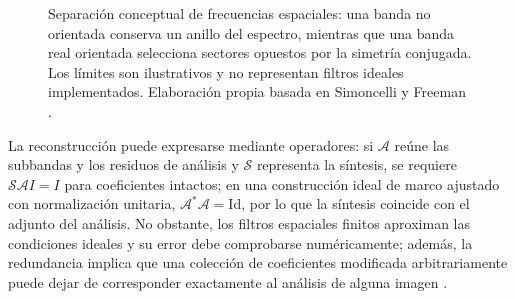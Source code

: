 \begin{figure}[htbp]
\centering
{}
\caption[Separación radial y angular de frecuencias espaciales]{Separación conceptual de frecuencias espaciales: una banda no orientada conserva un anillo del espectro, mientras que una banda real orientada selecciona sectores opuestos por la simetría conjugada. Los límites son ilustrativos y no representan filtros ideales implementados. Elaboración propia basada en Simoncelli y Freeman \cite{simoncelli1995steerable}.}
\label{fig:piramides_espectro}
\end{figure}

La reconstrucción puede expresarse mediante operadores: si $\mathcal{A}$ reúne las subbandas y los residuos de análisis y $\mathcal{S}$ representa la síntesis, se requiere $\mathcal{S}\mathcal{A}I=I$ para coeficientes intactos; en una construcción ideal de marco ajustado con normalización unitaria, $\mathcal{A}^{*}\mathcal{A}=\mathrm{Id}$, por lo que la síntesis coincide con el adjunto del análisis. No obstante, los filtros espaciales finitos aproximan las condiciones ideales y su error debe comprobarse numéricamente; además, la redundancia implica que una colección de coeficientes modificada arbitrariamente puede dejar de corresponder exactamente al análisis de alguna imagen \cite{simoncelli1995steerable}.

